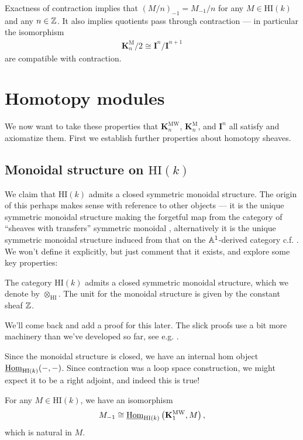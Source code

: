 \documentclass[11pt,openany]{book}
\providecommand{\HI}{\mathrm{HI}}
\providecommand{\KM}{\mathbf{K}^\mathrm{M}}
\providecommand{\KMW}{\mathbf{K}^\mathrm{MW}}
\begin{document}
\begin{corollary} Exactness of contraction implies that $(M/n)_{-1} = M_{-1}/n$ for any $M \in \HI(k)$ and any $n \in \mathbb{Z}$. It also implies quotients pass through contraction --- in particular the isomorphism
\begin{align*}
    \KM_n/2 \cong \mathbf{I}^n/\mathbf{I}^{n+1}
\end{align*}
are compatible with contraction.
\end{corollary}


\section{Homotopy modules}

We now want to take these properties that $\KMW_n$, $\KM_n$, and $\mathbf{I}^n$ all satisfy and axiomatize them. First we establish further properties about homotopy sheaves.

\subsection{Monoidal structure on $\HI(k)$}

We claim that $\HI(k)$ admits a closed symmetric monoidal structure. The origin of this perhaps makes sense with reference to other objects --- it is the unique symmetric monoidal structure making the forgetful map from the category of ``sheaves with transfers'' symmetric monoidal \cite[Lemme~1.8]{Deglise-MH}, alternatively it is the unique symmetric monoidal structure induced from that on the $\mathbb{A}^1$-derived category c.f. \cite[1.5.1.20]{Feld-thesis}. We won't define it explicitly, but just comment that it exists, and explore some key properties:

\begin{theorem} The category $\HI(k)$ admits a closed symmetric monoidal structure, which we denote by $\otimes_\HI$. The unit for the monoidal structure is given by the constant sheaf $\mathbb{Z}$. 
\end{theorem}
We'll come back and add a proof for this later. The slick proofs use a bit more machinery than we've developed so far, see e.g. \cite[4.2.1.20]{Feld-thesis}.

Since the monoidal structure is closed, we have an internal hom object $\underline{\Hom}_{\HI(k)}(-,-)$. Since contraction was a loop space construction, we might expect it to be a right adjoint, and indeed this is true!

\begin{proposition} For any $M \in \HI(k)$, we have an isomorphism
\begin{align*}
    M_{-1} \cong \underline{\Hom}_{\HI(k)} \left( \KMW_1, M \right),
\end{align*}
which is natural in $M$.
\end{proposition}
\end{document}
